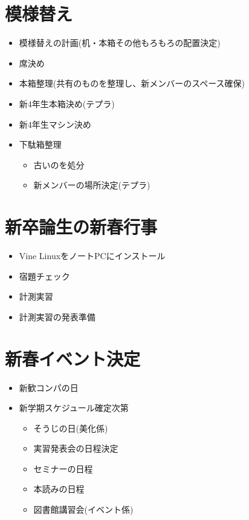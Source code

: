 \documentclass[twocolumn,11pt]{jsarticle}
\begin{document}
\section{模様替え}
\begin{itemize}
\item 模様替えの計画(机・本箱その他もろもろの配置決定)
\item 席決め
\item 本箱整理(共有のものを整理し、新メンバーのスペース確保)
\item 新4年生本箱決め(テプラ)
\item 新4年生マシン決め
\item 下駄箱整理
  \begin{itemize}
  \item 古いのを処分
  \item 新メンバーの場所決定(テプラ)
  \end{itemize}
\end{itemize}

\section{新卒論生の新春行事}
\begin{itemize}
\item Vine LinuxをノートPCにインストール
\item 宿題チェック
\item 計測実習
\item 計測実習の発表準備
\end{itemize}

\section{新春イベント決定}
\begin{itemize}
\item 新歓コンパの日
\item 新学期スケジュール確定次第
  \begin{itemize}
  \item そうじの日(美化係)
  \item 実習発表会の日程決定
  \item セミナーの日程
  \item 本読みの日程
  \item 図書館講習会(イベント係)
  \end{itemize}
\end{itemize}

\appendix
\end{document}
